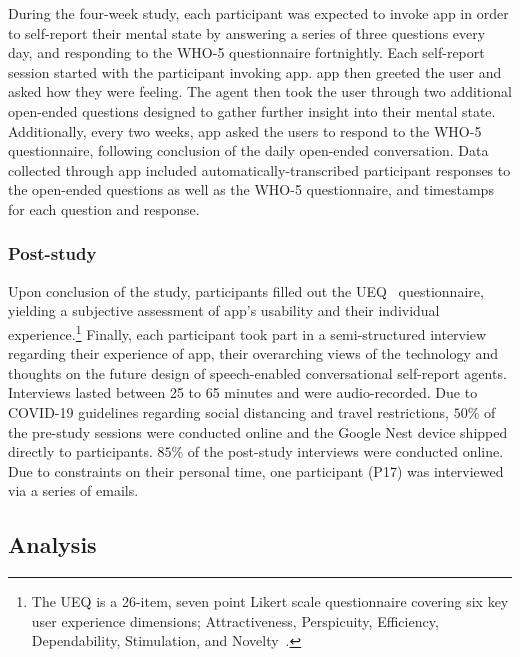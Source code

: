             During the four-week study, each participant was expected to invoke \acl{app} in order to self-report their mental state by answering a series of three questions every day, and responding to the \ac{WHO-5} questionnaire fortnightly. Each self-report session started with the participant invoking \acl{app}. \acl{app} then greeted the user and asked how they were feeling. The agent then took the user through two additional open-ended questions designed to gather further insight into their mental state. Additionally, every two weeks, \acl{app} asked the users to respond to the \ac{WHO-5} questionnaire, following conclusion of the daily open-ended conversation. Data collected through \acl{app} included automatically-transcribed participant responses to the open-ended questions as well as the \ac{WHO-5} questionnaire, and timestamps for each question and response. 
            
        \subsubsection{Post-study}\label{sec:post_study}
            
            Upon conclusion of the study, participants filled out the \ac{UEQ}~\cite{laugwitz2008construction} questionnaire, yielding a subjective assessment of \acl{app}'s usability and their individual experience.\footnote{The \ac{UEQ} is a 26-item, seven point Likert scale questionnaire covering six key user experience dimensions; Attractiveness, Perspicuity, Efficiency, Dependability, Stimulation, and Novelty~\cite{laugwitz2008construction}.} Finally, each participant took part in a semi-structured interview regarding their experience of \acl{app}, their overarching views of the technology and thoughts on the future design of speech-enabled conversational self-report agents. Interviews lasted between 25 to 65 minutes and were audio-recorded. Due to COVID-19 guidelines regarding social distancing and travel restrictions, $50\%$ of the pre-study sessions were conducted online and the Google Nest device shipped directly to participants. $85\%$ of the post-study interviews were conducted online. Due to constraints on their personal time, one participant (P17) was interviewed via a series of emails.
         
    \subsection{Analysis}
    
